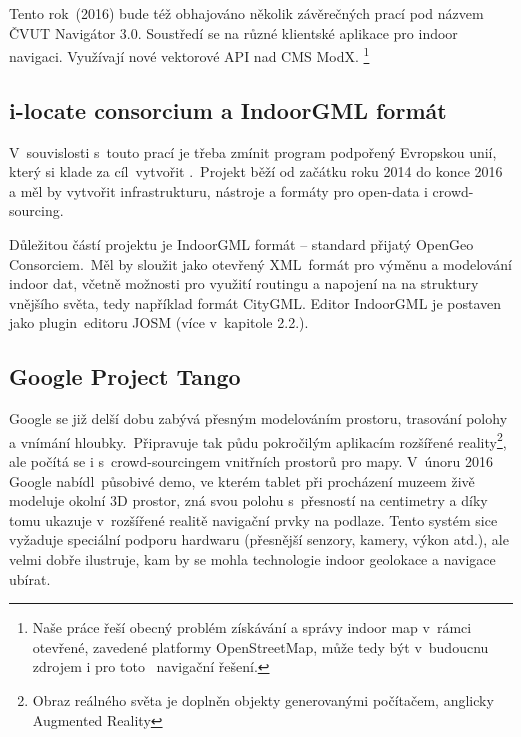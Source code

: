 Tento rok~(2016) bude též obhajováno několik závěrečných prací pod názvem ČVUT Navigátor 3.0. Soustředí se na různé klientské aplikace pro indoor navigaci. Využívají nové vektorové API nad CMS ModX. \footnote{Naše práce řeší obecný problém získávání a správy indoor map v~rámci otevřené, zavedené platformy OpenStreetMap, může tedy být v~budoucnu zdrojem i pro toto ~navigační řešení. }

\subsection{i-locate consorcium a IndoorGML formát}\label{i-locate-consorcium-a-indoorgml-formuxe1t}

V~souvislosti s~touto prací je třeba zmínit program podpořený Evropskou unií, který si klade za cíl~vytvořit .\cite{zdroj28}~Projekt běží od začátku roku 2014 do konce 2016 a měl by vytvořit infrastrukturu, nástroje a formáty pro open-data i crowd-sourcing.

Důležitou částí projektu je IndoorGML formát -- standard přijatý OpenGeo Consorciem.\cite{zdroj29}~Měl by sloužit jako otevřený XML~formát pro výměnu a modelování indoor dat, včetně možnosti pro využití routingu a napojení na na struktury vnějšího světa, tedy například formát CityGML. Editor IndoorGML je postaven jako plugin\cite{zdroj30}~editoru JOSM (více v~kapitole 2.2.).

\subsection{Google Project Tango}\label{google-project-tango}

Google se již delší dobu zabývá přesným modelováním prostoru, trasování polohy a vnímání hloubky.\cite{zdroj31}~Připravuje tak půdu pokročilým aplikacím rozšířené reality\footnote{Obraz reálného světa je doplněn objekty generovanými počítačem, anglicky Augmented Reality}, ale počítá se i s~crowd-sourcingem vnitřních prostorů pro mapy. V~únoru 2016 Google nabídl~působivé demo\cite{zdroj32}, ve kterém tablet při procházení muzeem živě modeluje okolní 3D prostor, zná svou polohu s~přesností na centimetry a díky tomu ukazuje v~rozšířené realitě navigační prvky na podlaze. Tento systém sice vyžaduje speciální podporu hardwaru (přesnější senzory, kamery, výkon atd.), ale velmi dobře ilustruje, kam by se mohla technologie indoor geolokace a navigace ubírat.

